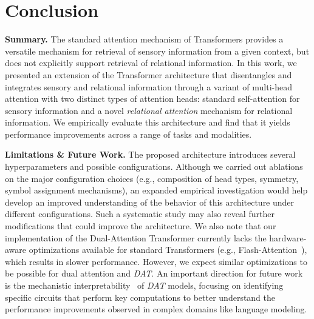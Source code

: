 \section{Conclusion}\label{sec:discussion}

\textbf{Summary.} The standard attention mechanism of Transformers provides a versatile mechanism for retrieval of sensory information from a given context, but does not explicitly support retrieval of relational information. In this work, we presented an extension of the Transformer architecture that disentangles and integrates sensory and relational information through a variant of multi-head attention with two distinct types of attention heads: standard self-attention for sensory information and a novel \textit{relational attention} mechanism for relational information. We empirically evaluate this architecture and find that it yields performance improvements across a range of tasks and modalities.

\textbf{Limitations \& Future Work.} The proposed architecture introduces several hyperparameters and possible configurations. Although we carried out ablations on the major configuration choices (e.g., composition of head types, symmetry, symbol assignment mechanisms), an expanded empirical investigation would help develop an improved understanding of the behavior of this architecture under different configurations. Such a systematic study may also reveal further modifications that could improve the architecture. We also note that our implementation of the Dual-Attention Transformer currently lacks the hardware-aware optimizations available for standard Transformers (e.g., Flash-Attention~\citep{dao2022flashattention}), which results in slower performance. However, we expect similar optimizations to be possible for dual attention and \textit{DAT}. An important direction for future work is the mechanistic interpretability~\citep{elhage2021mathematical,olsson2022context,wang2023interpretability} of \textit{DAT} models, focusing on identifying specific circuits that perform key computations to better understand the performance improvements observed in complex domains like language modeling.